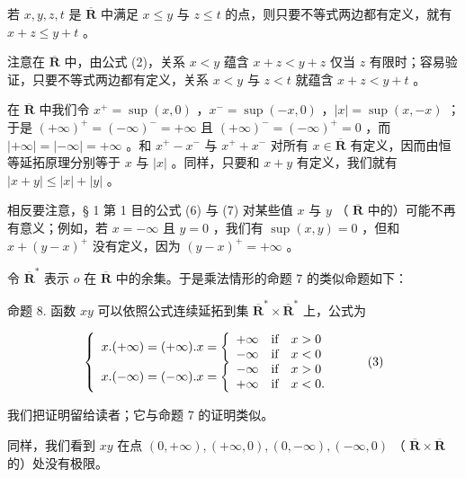 若 \(x, y, z, t\) 是 \(\overline{\mathbf{R}}\) 中满足 \(x \leqslant y\) 与 \(z \leqslant t\) 的点，则只要不等式两边都有定义，就有 \(x + z \leqslant y + t\) 。

注意在 \(\overline{\mathbf{R}}\) 中，由公式 (2)，关系 \(x < y\) 蕴含 \(x + z < y + z\) 仅当 \(z\) 有限时；容易验证，只要不等式两边都有定义，关系 \(x < y\) 与 \(z < t\) 就蕴含 \(x + z < y + t\) 。

在 \(\overline{\mathbf{R}}\) 中我们令 \(x^{+} = \sup (x,0)\) ，\(x^{-} = \sup (-x,0)\) ，\(|x| = \sup (x, - x)\) ；于是 \((+\infty)^{+} = (-\infty)^{-} = +\infty\) 且 \((+\infty)^{-} = (-\infty)^{+} = 0\) ，而 \(|+\infty| = |- \infty| = +\infty\) 。和 \(x^{+} - x^{-}\) 与 \(x^{+} + x^{-}\) 对所有 \(x \in \overline{\mathbf{R}}\) 有定义，因而由恒等延拓原理分别等于 \(x\) 与 \(|x|\) 。同样，只要和 \(x + y\) 有定义，我们就有 \(|x + y| \leqslant |x| + |y|\) 。

相反要注意，§ 1 第 1 目的公式 (6) 与 (7) 对某些值 \(x\) 与 \(y\) （ \(\overline{\mathbf{R}}\) 中的）可能不再有意义；例如，若 \(x = -\infty\) 且 \(y = 0\) ，我们有 \(\sup (x, y) = 0\) ，但和 \(x + (y - x)^+\) 没有定义，因为 \((y - x)^+ = +\infty\) 。

令 \(\overline{\mathbf{R}}^{*}\) 表示 \(o\) 在 \(\overline{\mathbf{R}}\) 中的余集。于是乘法情形的命题 7 的类似命题如下：

命题 8. 函数 \(xy\) 可以依照公式连续延拓到集 \(\overline{\mathbf{R}}^* \times \overline{\mathbf{R}}^*\) 上，公式为

\[
\left\{ \begin{array}{l} x. (+ \infty) = (+ \infty). x = \left\{ \begin{array}{l l} + \infty & \text {if} \quad x > 0 \\ - \infty & \text {if} \quad x <   0 \end{array} \right. \\ x. (- \infty) = (- \infty). x = \left\{ \begin{array}{l l} - \infty & \text {if} \quad x > 0 \\ + \infty & \text {if} \quad x <   0. \end{array} \right. \end{array} \right.\tag{3}
\]

我们把证明留给读者；它与命题 7 的证明类似。

同样，我们看到 \(xy\) 在点 \((0, +\infty), (+\infty, 0), (0, -\infty), (-\infty, 0)\) （ \(\overline{\mathbf{R}} \times \overline{\mathbf{R}}\) 的）处没有极限。

